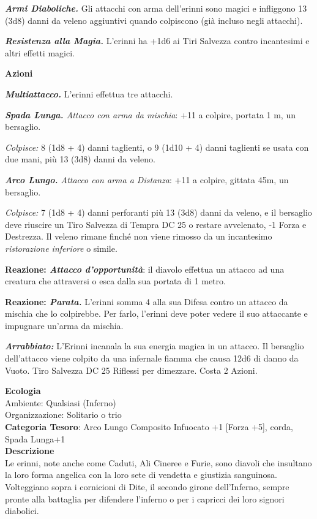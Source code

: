 \begin{multicols}{2}
{\emph{\textbf{Armi Diaboliche.}} Gli attacchi con arma dell'erinni sono magici e infliggono 13 (3d8) danni da veleno aggiuntivi quando colpiscono (già incluso negli attacchi).

\emph{\textbf{Resistenza alla Magia.}} L'erinni ha +1d6 ai Tiri Salvezza contro incantesimi e altri effetti magici.

\textbf{Azioni}

\emph{\textbf{Multiattacco.}} L'erinni effettua tre attacchi.

\emph{\textbf{Spada Lunga.} Attacco con arma da mischia}: +11 a colpire, portata 1 m, un bersaglio.

\emph{Colpisce:} 8 (1d8 + 4) danni taglienti, o 9 (1d10 + 4) danni taglienti se usata con due mani, più 13 (3d8) danni da veleno.

\emph{\textbf{Arco Lungo.} Attacco con arma a Distanza}: +11 a colpire, gittata 45m, un bersaglio.

\emph{Colpisce:} 7 (1d8 + 4) danni perforanti più 13 (3d8) danni da veleno, e il bersaglio deve riuscire un Tiro Salvezza di Tempra DC 25 o restare avvelenato, -1 Forza e Destrezza. Il veleno rimane finché non viene rimosso da un incantesimo \emph{ristorazione inferiore} o simile.

\textbf{Reazione: \emph{Attacco d'opportunità}}: il diavolo effettua un attacco ad una creatura che attraversi o esca dalla sua portata di 1 metro.

\textbf{Reazione: \emph{Parata.}} L'erinni somma 4 alla sua Difesa contro un attacco da mischia che lo colpirebbe. Per farlo, l'erinni deve poter vedere il suo attaccante e impugnare un'arma da mischia.

\emph{\textbf{Arrabbiato:}} L'Erinni incanala la sua energia magica in un attacco. Il bersaglio dell'attacco viene colpito da una infernale fiamma che causa 12d6 di danno da Vuoto. Tiro Salvezza DC 25 Riflessi per dimezzare. Costa 2 Azioni.

\textbf{Ecologia}\\
Ambiente: Qualsiasi (Inferno)\\
Organizzazione: Solitario o trio\\
\textbf{Categoria Tesoro}: Arco Lungo Composito Infuocato +1 [Forza +5], corda, Spada Lunga+1\\
\textbf{Descrizione}\\
Le erinni, note anche come Caduti, Ali Cineree e Furie, sono diavoli che insultano la loro forma angelica con la loro sete di vendetta e giustizia sanguinosa. Volteggiano sopra i cornicioni di Dite, il secondo girone dell'Inferno, sempre pronte alla battaglia per difendere l'inferno o per i capricci dei loro signori diabolici.

}
\end{multicols}
